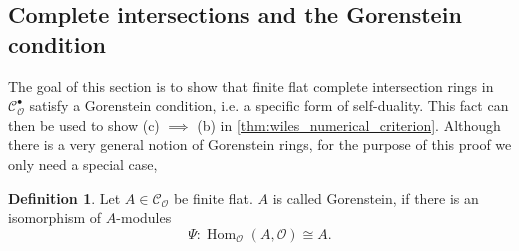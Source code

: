 \documentclass{article}
\theoremstyle{plain}%
\theoremstyle{definition}
\newtheorem{definition}{Definition}[section]
\theoremstyle{remark}
\newcommand{\cob}{\mathcal{C}_\mathcal{O}^\bullet}
\newcommand{\co}{\mathcal{C}_\mathcal{O}}
\renewcommand{\hom}{\operatorname{Hom}}
\begin{document}
    \subsection{Complete intersections and the Gorenstein condition}
    The goal of this section is to show that finite flat complete intersection rings in \(\cob\) 
    satisfy a Gorenstein condition, i.e. a specific form of self-duality.
    This fact can then be used to show (c) \(\implies\) (b) in \cref{thm:wiles_numerical_criterion}.
    Although there is a very general notion of Gorenstein rings, for
    the purpose of this proof we only need a special case,
    \begin{definition}
        Let \(A \in \co\) be finite flat. \(A\) is called Gorenstein, if there is an isomorphism of \(A\)-modules
        \[
            \Psi\colon \hom_\mathcal{O}(A, \mathcal{O}) \cong A.
        \]
    \end{definition}
    
\end{document}
